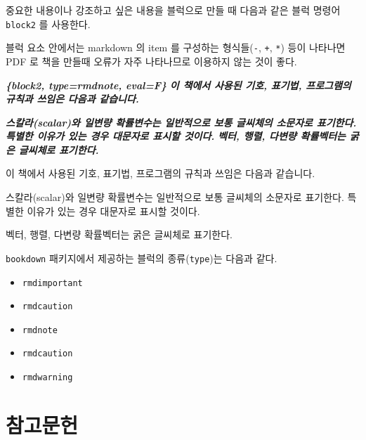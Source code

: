 \documentclass[
]{book}
\makeatletter
\newenvironment{Shaded}{\begin{snugshade}}{\end{snugshade}}
\newcommand{\InformationTok}[1]{\textcolor[rgb]{0.56,0.35,0.01}{\textbf{\textit{#1}}}}
\newenvironment{kframe}{%
\medskip{}
\setlength{\fboxsep}{.8em}
 \def\at@end@of@kframe{}%
 \ifinner\ifhmode%
  \def\at@end@of@kframe{\end{minipage}}%
  \begin{minipage}{\columnwidth}%
 \fi\fi%
 \def\FrameCommand##1{\hskip\@totalleftmargin \hskip-\fboxsep
 \colorbox{shadecolor}{##1}\hskip-\fboxsep
     \hskip-\linewidth \hskip-\@totalleftmargin \hskip\columnwidth}%
 \MakeFramed {\advance\hsize-\width
   \@totalleftmargin\z@ \linewidth\hsize
   \@setminipage}}%
 {\par\unskip\endMakeFramed%
 \at@end@of@kframe}
\newenvironment{rmdblock}[1]
  {
  \begin{itemize}
  \renewcommand{\labelitemi}{
    \raisebox{-.7\height}[0pt][0pt]{
      {\setkeys{Gin}{width=3em,keepaspectratio}\texttt{[image: images/\#1]}}
    }
  }
  \setlength{\fboxsep}{1em}
  \begin{kframe}
  \item
  }
  {
  \end{kframe}
  \end{itemize}
  }
\newenvironment{rmdnote}
  {\begin{rmdblock}{note}}
  {\end{rmdblock}}
\newenvironment{rmdcaution}
  {\begin{rmdblock}{caution}}
  {\end{rmdblock}}
\theoremstyle{definition}
\theoremstyle{definition}
\theoremstyle{definition}
\theoremstyle{definition}
\theoremstyle{remark}
\makeatother
\begin{document}
중요한 내용이나 강조하고 싶은 내용을 블럭으로 만들 때 다음과 같은 블럭 명령어 \texttt{block2} 를 사용한다.

\begin{rmdcaution}
블럭 요소 안에서는 markdown 의 item 를 구성하는 형식들(\texttt{-}, \texttt{+}, \texttt{*}) 등이 나타나면 PDF 로 책을 만들때 오류가 자주 나타나므로 이용하지 않는 것이 좋다.
\end{rmdcaution}

\begin{Shaded}
\begin{Highlighting}[]
\InformationTok{\textasciigrave{}\textasciigrave{}\textasciigrave{}\{block2, type=\textquotesingle{}rmdnote\textquotesingle{}, eval=F\}}
\InformationTok{이 책에서 사용된 기호, 표기법, 프로그램의 규칙과 쓰임은 다음과 같습니다.}

\InformationTok{스칼라(scalar)와 일변량 확률변수는 일반적으로  보통 글씨체의 소문자로  표기한다. 특별한 이유가     있는 경우 대문자로 표시할 것이다. }
\InformationTok{벡터, 행렬, 다변량 확률벡터는 굵은 글씨체로 표기한다.}
\InformationTok{\textasciigrave{}\textasciigrave{}\textasciigrave{}}
\end{Highlighting}
\end{Shaded}

\begin{rmdnote}
이 책에서 사용된 기호, 표기법, 프로그램의 규칙과 쓰임은 다음과 같습니다.

스칼라(scalar)와 일변량 확률변수는 일반적으로 보통 글씨체의 소문자로 표기한다. 특별한 이유가 있는 경우 대문자로 표시할 것이다.

벡터, 행렬, 다변량 확률벡터는 굵은 글씨체로 표기한다.
\end{rmdnote}

\texttt{bookdown} 패키지에서 제공하는 블럭의 종류(\texttt{type})는 다음과 같다.

\begin{itemize}
\item
  \texttt{rmdimportant}
\item
  \texttt{rmdcaution}
\item
  \texttt{rmdnote}
\item
  \texttt{rmdcaution}
\item
  \texttt{rmdwarning}
\end{itemize}

\hypertarget{uxcc38uxace0uxbb38uxd5cc}{%
\section{참고문헌}\label{uxcc38uxace0uxbb38uxd5cc}}
\end{document}
